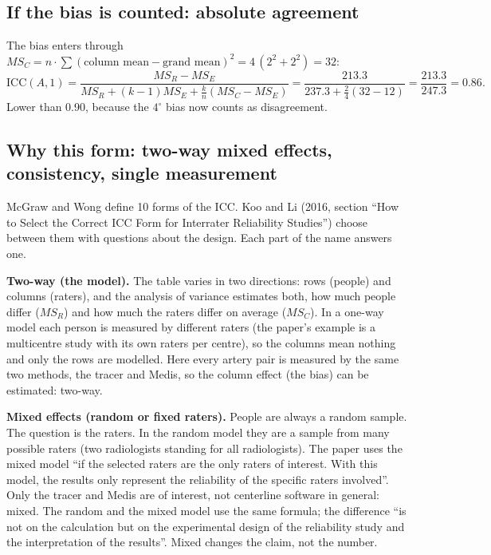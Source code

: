 \documentclass[11pt]{article}
\begin{document}
\subsection*{If the bias is counted: absolute agreement}

The bias enters through $MS_C = n \cdot \sum (\text{column mean} - \text{grand mean})^2 = 4\,(2^2 + 2^2) = 32$:
\[
  \text{ICC}(A,1) = \frac{MS_R - MS_E}{MS_R + (k-1)MS_E + \frac{k}{n}(MS_C - MS_E)}
                  = \frac{213.3}{237.3 + \frac{2}{4}(32-12)} = \frac{213.3}{247.3} = 0.86 .
\]
Lower than 0.90, because the $4^\circ$ bias now counts as disagreement.

\subsection*{Why this form: two-way mixed effects, consistency, single measurement}

McGraw and Wong define 10 forms of the ICC. Koo and Li (2016, section ``How to Select the Correct ICC Form for
Interrater Reliability Studies'') choose between them with questions about the design. Each part of the name
answers one.

\textbf{Two-way (the model).} The table varies in two directions: rows (people) and columns (raters), and the
analysis of variance estimates both, how much people differ ($MS_R$) and how much the raters differ on average
($MS_C$). In a one-way model each person is measured by different raters (the paper's example is a multicentre
study with its own raters per centre), so the columns mean nothing and only the rows are modelled. Here every
artery pair is measured by the same two methods, the tracer and Medis, so the column effect (the bias) can be
estimated: two-way.

\textbf{Mixed effects (random or fixed raters).} People are always a random sample. The question is the raters.
In the random model they are a sample from many possible raters (two radiologists standing for all radiologists).
The paper uses the mixed model ``if the selected raters are the only raters of interest. With this model, the
results only represent the reliability of the specific raters involved''. Only the tracer and Medis are of
interest, not centerline software in general: mixed. The random and the mixed model use the same formula; the
difference ``is not on the calculation but on the experimental design of the reliability study and the
interpretation of the results''. Mixed changes the claim, not the number.
\end{document}
